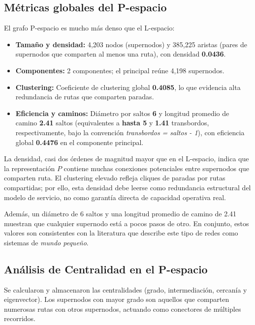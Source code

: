         \subsection{Métricas globales del P-espacio}
            El grafo P-espacio es mucho más denso que el L-espacio:
            \begin{itemize}
                \item \textbf{Tamaño y densidad:} 4,203 nodos (supernodos) y 385,225 aristas (pares de supernodos que comparten al menos una ruta), con densidad \textbf{0.0436}.
                \item \textbf{Componentes:} 2 componentes; el principal reúne 4,198 supernodos.
                \item \textbf{Clustering:} Coeficiente de clustering global \textbf{0.4085}, lo que evidencia alta redundancia de rutas que comparten paradas.
                \item \textbf{Eficiencia y caminos:} Diámetro por saltos \textbf{6} y longitud promedio de camino \textbf{2.41} saltos (equivalentes a \textbf{hasta 5} y \textbf{1.41} transbordos, respectivamente, bajo la convención \textit{transbordos = saltos - 1}), con eficiencia global \textbf{0.4476} en el componente principal.
            \end{itemize}
	    La densidad, casi dos órdenes de magnitud mayor que en el L-espacio, indica que la representación \(P\) contiene muchas conexiones potenciales entre supernodos que comparten ruta. El clustering elevado refleja cliques de paradas por rutas compartidas; por ello, esta densidad debe leerse como redundancia estructural del modelo de servicio, no como garantía directa de capacidad operativa real.

            Además, un diámetro de 6 saltos y una longitud promedio de camino de 2.41 muestran que cualquier supernodo está a pocos pasos de otro. En conjunto, estos valores son consistentes con la literatura que describe este tipo de redes como sistemas de \textit{mundo pequeño}.

        \subsection{Análisis de Centralidad en el P-espacio}
            Se calcularon y almacenaron las centralidades (grado, intermediación, cercanía y eigenvector). Los supernodos con mayor grado son aquellos que comparten numerosas rutas con otros supernodos, actuando como conectores de múltiples recorridos.

